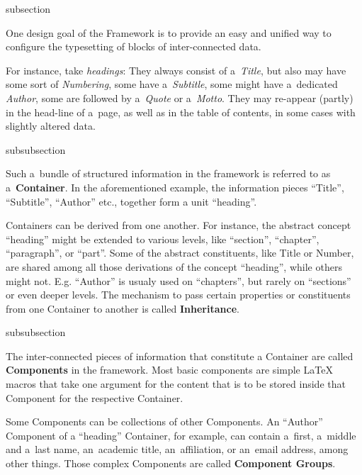 \begin{Heading}[label=sec:concepts]{subsection}
\end{Heading}

One design goal of the {\CoCoTeX} Framework is to provide an easy and
unified way to configure the typesetting of blocks of inter-connected
data.

For instance, take \textit{headings}: They always consist of
a~\textit{Title}, but also may have some sort of \textit{Numbering},
some have a~\textit{Subtitle}, some might have a~dedicated
\textit{Author}, some are followed by a~\textit{Quote} or
a~\textit{Motto}. They may re-appear (partly) in the head-line of
a~page, as well as in the table of contents, in some cases with
slightly altered data.


\begin{Heading}[label=sec:overview.containers]{subsubsection}
\end{Heading}

Such a~bundle of structured information in the {\CoCoTeX} framework is
referred to as a~\textbf{Container}. In the
aforementioned example, the information pieces “Title”, “Subtitle”,
“Author” etc., together form a unit “heading”.

Containers can be derived from one another. For instance, the abstract
concept “heading” might be extended to various levels, like “section”,
“chapter”, “paragraph”, or “part”. Some of the abstract constituents,
like Title or Number, are shared among all those derivations of the
concept “heading”, while others might not. E.g. “Author” is usualy
used on “chapters”, but rarely on “sections” or even deeper
levels. The mechanism to pass certain properties or constituents from
one Container to another is called
\textbf{Inheritance}.

\begin{Heading}[label=sec:overview.components]{subsubsection}
\end{Heading}

The inter-connected pieces of information that constitute a Container
are called \textbf{Components} in the
{\CoCoTeX} framework. Most basic components are simple {\LaTeX} macros
that take one argument for the content that is to be stored inside
that Component for the respective Container.

Some Components can be collections of other Components. An “Author”
Component of a “heading” Container, for example, can contain a~first,
a~middle and a~last name, an~academic title, an~affiliation, or
an~email address, among other things. Those complex Components are
called \textbf{Component Groups}.


